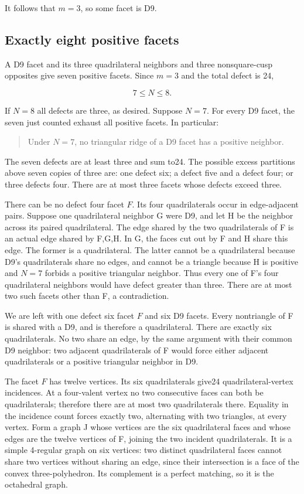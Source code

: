 \documentclass[11pt]{article}
\theoremstyle{remark}
\begin{document}
It follows that \textbf{\(m=3\)}, so some facet is D9.

\subsection{Exactly eight positive facets}\label{exactly-eight-positive-facets-all-d9}

A D9 facet and its three quadrilateral neighbors and three nonsquare-cusp opposites give seven positive facets. Since \(m=3\) and the total defect is 24,

\[
 7\le N\le8.
\]

If \(N=8\) all defects are three, as desired. Suppose \(N=7\). For every D9 facet, the seven just counted exhaust all positive facets. In particular:

\begin{quote}
Under \(N=7\), no triangular ridge of a D9 facet has a positive neighbor.
\end{quote}

The seven defects are at least three and sum to24. The possible excess partitions above seven copies of three are: one defect six; a defect five and a defect four; or three defects four. There are at most three facets whose defects exceed three.

There can be no defect four facet \(F\). Its four quadrilaterals occur in edge-adjacent pairs. Suppose one quadrilateral neighbor G were D9, and let H be the neighbor across its paired quadrilateral. The edge shared by the two quadrilaterals of F is an actual edge shared by F,G,H. In G, the faces cut out by F and H share this edge. The former is a quadrilateral. The latter cannot be a quadrilateral because D9's quadrilaterals share no edges, and cannot be a triangle because H is positive and \(N=7\) forbids a positive triangular neighbor. Thus every one of F's four quadrilateral neighbors would have defect greater than three. There are at most two such facets other than F, a contradiction.

We are left with one defect six facet \(F\) and six D9 facets. Every nontriangle of F is shared with a D9, and is therefore a quadrilateral. There are exactly six quadrilaterals. No two share an edge, by the same argument with their common D9 neighbor: two adjacent quadrilaterals of F would force either adjacent quadrilaterals or a positive triangular neighbor in D9.

The facet \(F\) has twelve vertices. Its six quadrilaterals give24 quadrilateral-vertex incidences. At a four-valent vertex no two consecutive faces can both be quadrilaterals; therefore there are at most two quadrilaterals there. Equality in the incidence count forces exactly two, alternating with two triangles, at every vertex. Form a graph J whose vertices are the six quadrilateral faces and whose edges are the twelve vertices of F, joining the two incident quadrilaterals. It is a simple 4-regular graph on six vertices: two distinct quadrilateral faces cannot share two vertices without sharing an edge, since their intersection is a face of the convex three-polyhedron. Its complement is a perfect matching, so it is the octahedral graph.
\end{document}
